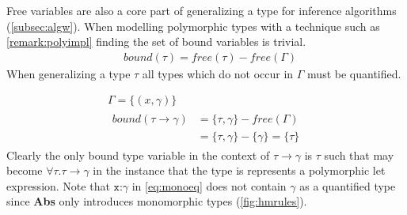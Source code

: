 \documentclass[11pt,oneside,a4paper]{report}
\begin{document}
Free variables are also a core part of generalizing a type for inference algorithms (\autoref{subsec:algw}).
When modelling polymorphic types with a technique such as \autoref{remark:polyimpl} finding the set of bound variables is trivial.
\begin{align}
    & \textit{bound}(\tau) = \textit{free}(\tau) - \textit{free}(\Gamma)
\end{align}
When generalizing a type $\tau$ all types which do not occur in $\Gamma$ must be quantified.
\begin{exmp}
\begin{gather}
    \Gamma = \{ (\textit{x}, \gamma) \} \label{eq:monoeq}\\
\begin{align}
    \textit{bound}(\tau \rightarrow \gamma) &= \{\tau , \gamma\} - \textit{free}(\Gamma)\\
    &= \{\tau , \gamma\} - \{ \gamma \} = \{ \tau \}\tag*{}
\end{align}
\end{gather}
Clearly the only bound type variable in the context of $\tau \rightarrow \gamma$ is $\tau$ such that may become $\forall \tau. \tau \rightarrow \gamma$ in the instance that the type is represents a polymorphic let expression.
    Note that $\texttt{x:}\gamma$ in \autoref{eq:monoeq} does not contain $\gamma$ as a quantified type since \textbf{Abs} only introduces monomorphic types (\autoref{fig:hmrules}).
\end{exmp}
\end{document}

